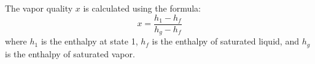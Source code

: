 The vapor quality \( x \) is calculated using the formula:  
\[
x = \frac{h_1 - h_f}{h_g - h_f}
\]  
where \( h_1 \) is the enthalpy at state 1, \( h_f \) is the enthalpy of saturated liquid, and \( h_g \) is the enthalpy of saturated vapor.